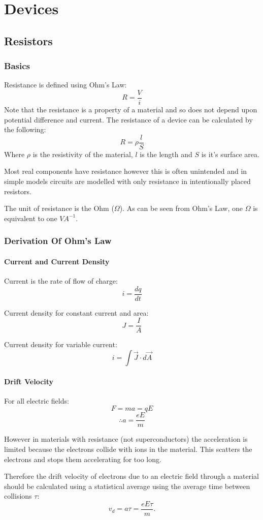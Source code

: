 \documentclass[11pt,a4paper]{report}
\begin{document}
\chapter{Devices}
\section{Resistors}
\subsection{Basics}
Resistance is defined using Ohm's Law:
\[R=\frac{V}{i}\] Note that the resistance is a property of a material and so does not depend upon potential difference and current. The resistance of a device can be calculated by the following:
\[R=\rho\frac{l}{S}\] Where $\rho$ is the resistivity of the material, $l$ is the length and $S$ is it's surface area.

Most real components have resistance however this is often unintended and in simple models circuits are modelled with only resistance in intentionally placed resistors.

The unit of resistance is the Ohm ($\Omega$). As can be seen from Ohm's Law, one $\Omega$ is equivalent to one $VA^{-1}$.

\subsection{Derivation Of Ohm's Law}
\subsubsection{Current and Current Density}
Current is the rate of flow of charge:
\[i=\frac{dq}{dt}\]

Current density for constant current and area: 
\[J = \frac{I}{A}\]

Current density for variable current: 
\[i = \int \vec{J} \cdot d\vec{A}\] 

\subsubsection{Drift Velocity}
For all electric fields:
\[F = ma = qE\]
\[\therefore a = \frac{eE}{m}\]

However in materials with resistance (not superconductors) the acceleration is limited because the electrons collide with ions in the material. This scatters the electrons and stops them accelerating for too long.

Therefore the drift velocity of electrons due to an electric field through a material should be calculated using a statistical average using the average time between collisions $\tau$:
\[v_d = a\tau = \frac{eE\tau}{m}.\]
\end{document}
